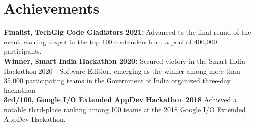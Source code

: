\documentclass[letterpaper,11pt]{article}
\begin{document}
\section{Achievements}
 \begin{itemize}[leftmargin=0.15in, label={}]
    \small{\item{
     \textbf{Finalist, TechGig Code Gladiators 2021:}{ Advanced to the final round of the event, earning a spot in the top 100 contenders from a pool of 400,000 participants.} \\
     \textbf{Winner, Smart India Hackathon 2020:}{ Secured victory in the Smart India Hackathon 2020 - Software Edition, emerging as the winner among more than 35,000 participating teams in the Government of India organized three-day hackathon.} \\
     \textbf{3rd/100, Google I/O Extended AppDev Hackathon 2018}{ Achieved a notable third-place ranking among 100 teams at the 2018 Google I/O Extended AppDev Hackathon.} \\
    }}
 \end{itemize}


\end{document}
